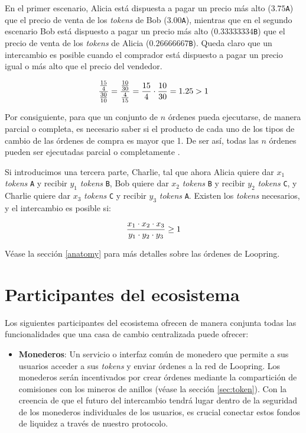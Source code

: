 \documentclass[UTF8,nofonts]{article}
\begin{document}
\begin{multicols}{2}
En el primer escenario, Alicia está dispuesta a pagar un precio más alto ($3.75$\verb|A|) que el precio de venta de los \textit{tokens} de Bob ($3.00$\verb|A|), mientras que en el segundo escenario Bob está dispuesto a pagar un precio más alto ($0.33333334$\verb|B|) que el precio de venta de los \textit{tokens} de Alicia ($0.26666667$\verb|B|). Queda claro que un intercambio es posible cuando el comprador está dispuesto a pagar un precio igual o más alto que el precio del vendedor.

\begin{equation}
{{15\over 4} \over {30\over 10}} = {{10\over 30} \over {4\over 15}}={15 \over 4} \cdot {10 \over 30} = 1.25 > 1
\end{equation}

Por consiguiente, para que un conjunto de $n$ órdenes pueda ejecutarse, de manera parcial o completa, es necesario saber si el producto de cada uno de los tipos de cambio de las órdenes de compra es mayor que 1. De ser así, todas las $n$ órdenes pueden ser ejecutadas parcial o completamente \cite{supersymmetry}.

Si introducimos una tercera parte, Charlie, tal que ahora Alicia quiere dar $x_1$ \textit{tokens} \verb|A| y recibir $y_1$ \textit{tokens} \verb|B|, Bob quiere dar $x_2$ \textit{tokens} \verb|B| y recibir $y_2$ \textit{tokens} \verb|C|, y Charlie quiere dar $x_3$ \textit{tokens} \verb|C| y recibir $y_3$ \textit{tokens} \verb|A|. Existen los \textit{tokens} necesarios, y el intercambio es posible si:

\begin{equation}
{{x_1 \cdot x_2 \cdot x_3 \over y_1 \cdot y_2 \cdot y_3} \geq 1}
\end{equation}

Véase la sección \ref{anatomy} para más detalles sobre las órdenes de Loopring.

\section{Participantes del ecosistema\label{sec:ecosystem}}
{\setlength{\parskip}{-1mm}%
Los siguientes participantes del ecosistema ofrecen de manera conjunta todas las funcionalidades que una casa de cambio centralizada puede ofrecer:}
\begin{itemize}

\item \textbf{Monederos}: Un servicio o interfaz común de monedero que permite a sus usuarios acceder a sus \textit{tokens} y enviar órdenes a la red de Loopring. Los monederos serán incentivados por crear órdenes mediante la compartición de comisiones con los mineros de anillos (véase la sección \ref{sec:token}). Con la creencia de que el futuro del intercambio tendrá lugar dentro de la seguridad de los monederos individuales de los usuarios, es crucial conectar estos fondos de liquidez  a través de nuestro protocolo.


\end{itemize}
\end{multicols}
\end{document}
